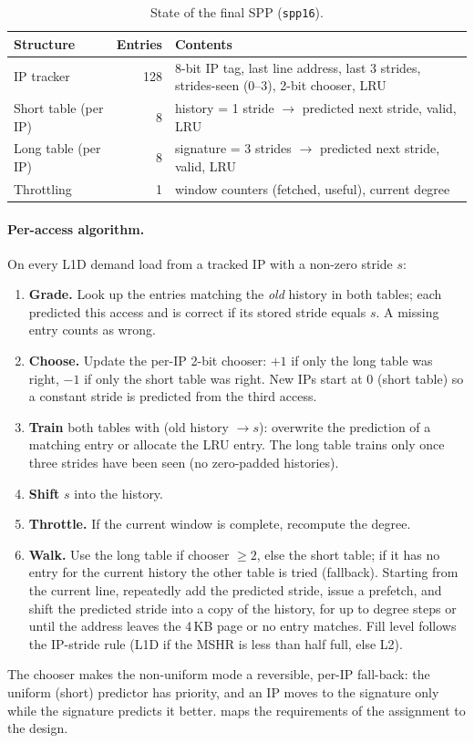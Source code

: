 \documentclass[12pt, a4paper]{article}
\newcommand{\tablesetup}{\small\renewcommand{\arraystretch}{1.15}\setlength{\tabcolsep}{4pt}}
\newcommand{\colhead}[1]{\textbf{#1}}
\begin{document}
\begin{table}[htbp]
\centering
\caption{State of the final SPP (\texttt{spp16}).}\label{tab:spp-structs}
\tablesetup
\begin{tabularx}{\linewidth}{lrL}
\toprule
{}\colhead{Structure} & \colhead{Entries} & \colhead{Contents} \\
\midrule
IP tracker & 128 & 8-bit IP tag, last line address, last 3 strides, strides-seen (0--3), 2-bit chooser, LRU \\
Short table (per IP) & 8 & history = 1 stride $\to$ predicted next stride, valid, LRU \\
Long table (per IP) & 8 & signature = 3 strides $\to$ predicted next stride, valid, LRU \\
Throttling & 1 & window counters (fetched, useful), current degree \\
\bottomrule
\end{tabularx}
\end{table}

\paragraph{Per-access algorithm.} On every L1D demand load from a tracked IP
with a non-zero stride $s$:
\begin{enumerate}[nosep]
  \item \textbf{Grade.} Look up the entries matching the \emph{old} history in
        both tables; each predicted this access and is correct if its stored
        stride equals $s$. A missing entry counts as wrong.
  \item \textbf{Choose.} Update the per-IP 2-bit chooser: $+1$ if only the long
        table was right, $-1$ if only the short table was right. New IPs start
        at 0 (short table) so a constant stride is predicted from the third
        access.
  \item \textbf{Train} both tables with (old history $\to s$): overwrite the
        prediction of a matching entry or allocate the LRU entry. The long
        table trains only once three strides have been seen (no zero-padded
        histories).
  \item \textbf{Shift} $s$ into the history.
  \item \textbf{Throttle.} If the current window is complete, recompute the degree.
  \item \textbf{Walk.} Use the long table if chooser $\ge 2$, else the short
        table; if it has no entry for the current history the other table is
        tried (fallback). Starting from the current line, repeatedly add the
        predicted stride, issue a prefetch, and shift the predicted stride into
        a copy of the history, for up to degree steps or until the
        address leaves the 4\,KB page or no entry matches. Fill level follows
        the IP-stride rule (L1D if the MSHR is less than half full, else L2).
\end{enumerate}
The chooser makes the non-uniform mode a reversible, per-IP fall-back: the
uniform (short) predictor has priority, and an IP moves to the signature only
while the signature predicts it better.  maps the
requirements of the assignment to the design.
\end{document}
